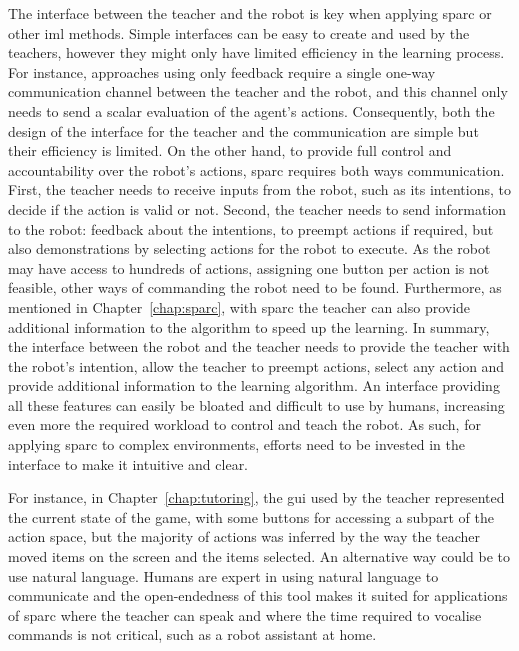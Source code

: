 The interface between the teacher and the robot is key when applying \gls{sparc} or other \gls{iml} methods. Simple interfaces can be easy to create and used by the teachers, however they might only have limited efficiency in the learning process. For instance, approaches using only feedback require a single one-way communication channel between the teacher and the robot, and this channel only needs to send a scalar evaluation of the agent's actions. Consequently, both the design of the interface for the teacher and the communication are simple but their efficiency is limited. On the other hand, to provide full control and accountability over the robot's actions, \gls{sparc} requires both ways communication. First, the teacher needs to receive inputs from the robot, such as its intentions, to decide if the action is valid or not. Second, the teacher needs to send information to the robot: feedback about the intentions, to preempt actions if required, but also demonstrations by selecting actions for the robot to execute. As the robot may have access to hundreds of actions, assigning one button per action is not feasible, other ways of commanding the robot need to be found. Furthermore, as mentioned in Chapter~\ref{chap:sparc}, with \gls{sparc} the teacher can also provide additional information to the algorithm to speed up the learning. In summary, the interface between the robot and the teacher needs to provide the teacher with the robot's intention, allow the teacher to preempt actions, select any action and provide additional information to the learning algorithm. An interface providing all these features can easily be bloated and difficult to use by humans, increasing even more the required workload to control and teach the robot. As such, for applying \gls{sparc} to complex environments, efforts need to be invested in the interface to make it intuitive and clear. 

For instance, in Chapter~\ref{chap:tutoring}, the \gls{gui} used by the teacher represented the current state of the game, with some buttons for accessing a subpart of the action space, but the majority of actions was inferred by the way the teacher moved items on the screen and the items selected. An alternative way could be to use natural language. Humans are expert in using natural language to communicate and the open-endedness of this tool makes it suited for applications of \gls{sparc} where the teacher can speak and where the time required to vocalise commands is not critical, such as a robot assistant at home.

